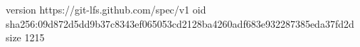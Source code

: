version https://git-lfs.github.com/spec/v1
oid sha256:09d872d5dd9b37c8343ef065053cd2128ba4260adf683e932287385eda37fd2d
size 1215
